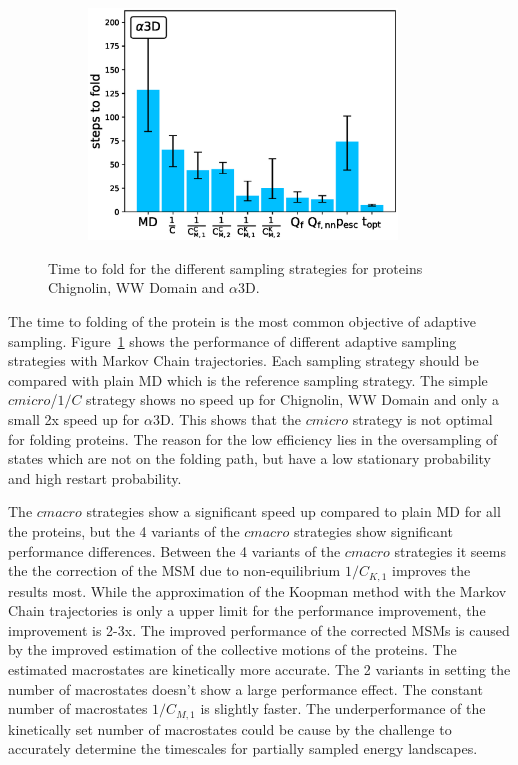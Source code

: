 \begin{figure}[H]
\begin{subfigure}[t]{0.5\textwidth}
    \includegraphics[width=0.9\textwidth]{figures/A3D_7_steps10000_nparallel100_fold.eps}   
  \end{subfigure}
  \caption{Time to fold for the different sampling strategies for proteins Chignolin, WW Domain and $\alpha$3D.}
  \label{fig:Time_fold}
\end{figure}


The time to folding of the protein is the most common objective of adaptive sampling. Figure~\ref{fig:Time_fold} shows the performance of different adaptive sampling strategies with Markov Chain trajectories.
Each sampling strategy should be compared with plain MD which is the reference sampling strategy.
The simple $cmicro$/$1/C$ strategy shows no speed up for Chignolin, WW Domain and only a small 2x speed up for $\alpha$3D. This shows that the $cmicro$ strategy is not optimal for folding proteins. The reason for the low efficiency lies in the oversampling of states which are not on the folding path, but have a low stationary probability and high restart probability.

The $cmacro$ strategies show a significant speed up compared to plain MD for all the proteins, but the 4 variants of the $cmacro$ strategies show significant performance differences.
Between the 4 variants of the $cmacro$ strategies it seems the the correction of the MSM due to non-equilibrium  $1/C_{K, 1}$ improves the results most. While the approximation of the Koopman method with the Markov Chain trajectories is only a upper limit for the performance improvement, the improvement is 2-3x. The improved performance of the corrected MSMs is caused by the improved estimation of the collective motions of the proteins. The estimated macrostates are kinetically more accurate. The 2 variants in setting the number of macrostates doesn't show a large performance effect. The constant number
of macrostates $1/C_{M, 1}$ is slightly faster. The underperformance of the kinetically set number of macrostates could be cause by the challenge to accurately determine the timescales for partially sampled energy landscapes.

